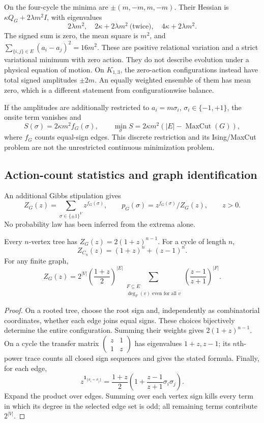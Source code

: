 On the four-cycle the minima are \(\pm(m,-m,m,-m)\).
Their Hessian is \(\kappa Q_G+2\lambda m^2I\), with eigenvalues
\[
 2\lambda m^2,\quad
 2\kappa+2\lambda m^2\ \text{(twice)},\quad
 4\kappa+2\lambda m^2 .
\]
The signed sum is zero, the mean square is \(m^2\), and
\(\sum_{\{i,j\}\in E}(a_i-a_j)^2=16m^2\).
These are positive relational variation and a strict variational
minimum with zero action.  They do not describe evolution under a
physical equation of motion.  On \(K_{1,3}\), the zero-action
configurations instead have total signed amplitudes \(\pm2m\).
An equally weighted ensemble of them has mean zero, which is a
different statement from configurationwise balance.

If the amplitudes are additionally restricted to \(a_i=m\sigma_i\),
\(\sigma_i\in\{-1,+1\}\), the onsite term vanishes and
\[
 S(\sigma)=2\kappa m^2 f_G(\sigma),\qquad
 \min_\sigma S=2\kappa m^2(|E|-\operatorname{MaxCut}(G)),
\]
where \(f_G\) counts equal-sign edges.  This discrete restriction and
its Ising/MaxCut problem are not the unrestricted continuous
minimization problem.

\subsection{Action-count statistics and graph identification}
\label{fin:partitions}

An additional Gibbs stipulation gives
\[
 Z_G(z)=\sum_{\sigma\in\{\pm1\}^V}z^{f_G(\sigma)},\qquad
 p_G(\sigma)=z^{f_G(\sigma)}/Z_G(z),\qquad z>0.
\]
No probability law has been inferred from the extrema alone.

\begin{proposition}
\label{fin:partition-theorem}
Every \(n\)-vertex tree has \(Z_G(z)=2(1+z)^{n-1}\).
For a cycle of length \(n\),
\[
 Z_{C_n}(z)=(1+z)^n+(z-1)^n .
\]
For any finite graph,
\[
 Z_G(z)=2^{|V|}\left(\frac{1+z}{2}\right)^{|E|}
 \sum_{\substack{F\subseteq E\\\deg_F(v)\text{ even for all }v}}
       \left(\frac{z-1}{z+1}\right)^{|F|}.
\]
\end{proposition}
\begin{proof}
On a rooted tree, choose the root sign and, independently as
combinatorial coordinates, whether each edge joins equal signs.
These choices bijectively determine the entire configuration.
Summing their weights gives \(2(1+z)^{n-1}\).
On a cycle the transfer matrix
\(\left(\begin{smallmatrix}z&1\\1&z\end{smallmatrix}\right)\)
has eigenvalues \(1+z,z-1\); its \(n\)th-power trace counts all closed
sign sequences and gives the stated formula.
Finally, for each edge,
\[
 z^{\mathbf1_{\{\sigma_i=\sigma_j\}}}
 =\frac{1+z}{2}\left(1+\frac{z-1}{z+1}\sigma_i\sigma_j\right).
\]
Expand the product over edges.  Summing over each vertex sign kills
every term in which its degree in the selected edge set is odd;
all remaining terms contribute \(2^{|V|}\).
\end{proof}

